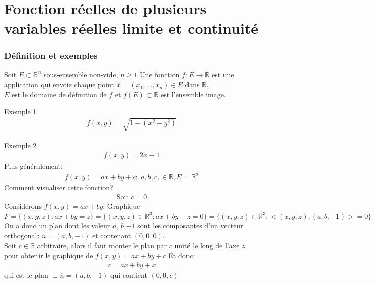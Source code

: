 \chapter{Fonction réelles de plusieurs variables réelles limite et continuité}
\subsection{Définition et exemples}
\begin{definition}
    Soit $E \subset \mathbb{R}^n $ sous-ensemble non-vide, $n \geq 1$ Une fonction $f : E \to \mathbb{R}$ est une application qui envoie chaque point $ \overline{x} = (x_1, \dots, x_n) \in E$ dans $ \mathbb{R}$. \\
    $E$ est le domaine de définition de $f$ et $f(E)\subset \mathbb{R}$ est l'ensemble image.
\end{definition}
\begin{parag}{Exemple 1}
    \begin{align*}
        f(x, y) = \sqrt{1 - (x^2 - y^2)}
    \end{align*}
    
    
\end{parag}
\begin{parag}{Exemple 2}
    \begin{align*}
        f(x, y) = 2x + 1
    \end{align*}
    Plus généralement:
    \begin{align*}
        f(x, y) = ax + by + c; \; a, b, c, \in \mathbb{R}, E = \mathbb{R}^2
    \end{align*}
  Comment visualiser cette fonction?\\
  \begin{align*}
      \text{Soit } c = 0
  \end{align*}
  Considérons $f(x, y) = ax + by$: Graphique $F = \{(x, y, z): ax + by = z\} = \{(x, y, z) \in \mathbb{R}^3: ax + by -z = 0\} = \{ (x, y, z) \in \mathbb{R}^3: <(x, y, z), (a, b, -1)> = 0\}$ On a donc un plan dont les valeur $a$, $b$ $-1$ sont les composantes d'un vecteur orthogonal: $ \overline{n} = (a, b, -1)$ et contenant $(0, 0, 0)$.
  \\
  Soit $c \in \mathbb{R}$ arbitraire, alors il faut monter le plan par $c$ unité le long de l'axe $z$ pour obtenir le graphique de $f(x, y) = ax+ by + c$ Et donc:
  \begin{align*}
      z = ax + by + x
  \end{align*}
  qui est le plan $ \perp \overline{n} = (a, b, -1)$ qui contient $(0, 0, c)$
  
  
    
\end{parag}
